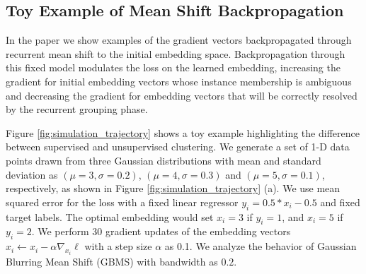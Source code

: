 %
%
%

\subsection{Toy Example of Mean Shift Backpropagation}
In the paper we show examples of the gradient vectors backpropagated through
recurrent mean shift to the initial embedding space. Backpropagation through
this fixed model modulates the loss on the learned embedding, increasing the
gradient for initial embedding vectors whose instance membership is ambiguous
and decreasing the gradient for embedding vectors that will be correctly
resolved by the recurrent grouping phase.

Figure \ref{fig:simulation_trajectory} shows a toy example highlighting the difference
between supervised and unsupervised clustering.  We generate  a set of 1-D data
points drawn from three Gaussian distributions with mean and standard deviation
as $(\mu=3, \sigma=0.2)$, $(\mu=4, \sigma=0.3)$ and $(\mu=5, \sigma=0.1)$,
respectively, as shown in Figure \ref{fig:simulation_trajectory} (a).
We use mean squared error for the loss with a fixed linear
regressor $y_i = 0.5*x_i-0.5$ and fixed target labels. The optimal embedding
would set $x_i=3$ if $y_i=1$, and $x_i=5$ if $y_i=2$. We perform 30 gradient
updates of the embedding vectors $x_i \leftarrow x_i - \alpha \nabla_{x_i}
\ell$ with a step size $\alpha$ as 0.1.
We analyze the behavior of Gaussian Blurring Mean Shift (GBMS) with bandwidth as $0.2$.


